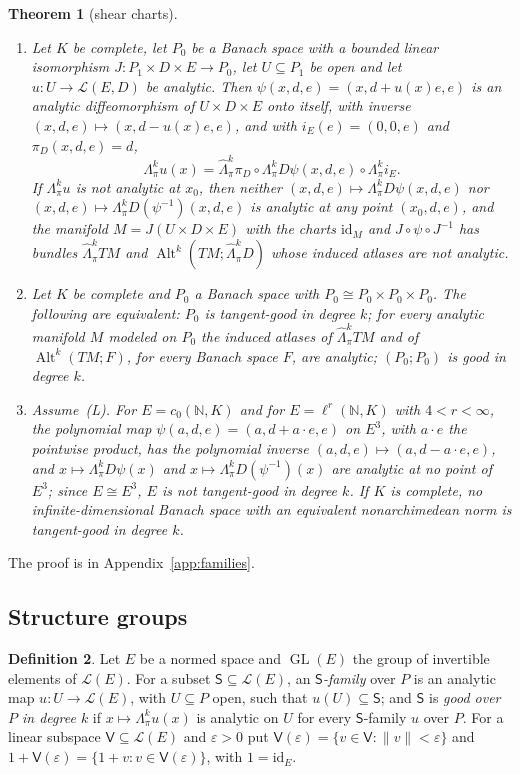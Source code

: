 \documentclass[11pt]{amsart}
\newtheorem{theorem}{Theorem}[section]
\theoremstyle{definition}
\newtheorem{definition}[theorem]{Definition}
\theoremstyle{remark}
\numberwithin{equation}{section}
\newcommand{\N}{\mathbb N}
\newcommand{\cL}{\mathcal L}
\newcommand{\Alt}{\operatorname{Alt}}
\newcommand{\id}{\mathrm{id}}
\newcommand{\norm}[1]{\lVert #1\rVert}
\theoremstyle{plain}
\theoremstyle{definition}
\theoremstyle{plain}
\newcommand{\hLambda}{\widehat\Lambda}
\begin{document}
\begin{theorem}[shear charts]\label{fam2:thm:tangent}
\begin{enumerate}
\item Let $K$ be complete, let $P_0$ be a Banach space with a bounded linear isomorphism $J\colon P_1\times D\times E\to P_0$,
let $U\subseteq P_1$ be open and let $u\colon U\to\cL(E,D)$ be analytic. Then $\psi(x,d,e)=(x,d+u(x)e,e)$ is an analytic
diffeomorphism of $U\times D\times E$ onto itself, with inverse $(x,d,e)\mapsto(x,d-u(x)e,e)$, and with $i_E(e)=(0,0,e)$
and $\pi_D(x,d,e)=d$,
\[
 \Lambda^k_\pi u(x)=\hLambda^k_\pi\pi_D\circ\Lambda^k_\pi D\psi(x,d,e)\circ\Lambda^k_\pi i_E.
\]
If $\Lambda^k_\pi u$ is not analytic at $x_0$, then neither $(x,d,e)\mapsto\Lambda^k_\pi D\psi(x,d,e)$ nor
$(x,d,e)\mapsto\Lambda^k_\pi D(\psi^{-1})(x,d,e)$ is analytic at any point $(x_0,d,e)$, and the manifold
$M=J(U\times D\times E)$ with the charts $\id_M$ and $J\circ\psi\circ J^{-1}$ has bundles $\hLambda^k_\pi TM$ and
$\Alt^k(TM;\hLambda^k_\pi D)$ whose induced atlases are not analytic.
\item Let $K$ be complete and $P_0$ a Banach space with $P_0\cong P_0\times P_0\times P_0$. The following are equivalent:
$P_0$ is tangent-good in degree $k$; for every analytic manifold $M$ modeled on $P_0$ the induced atlases of
$\hLambda^k_\pi TM$ and of $\Alt^k(TM;F)$, for every Banach space $F$, are analytic; $(P_0;P_0)$ is good in degree $k$.
\item Assume~\textup{(L)}. For $E=c_0(\N,K)$ and for $E=\ell^r(\N,K)$ with $4<r<\infty$, the polynomial map
$\psi(a,d,e)=(a,d+a\cdot e,e)$ on $E^3$, with $a\cdot e$ the pointwise product, has the polynomial inverse
$(a,d,e)\mapsto(a,d-a\cdot e,e)$, and $x\mapsto\Lambda^k_\pi D\psi(x)$ and $x\mapsto\Lambda^k_\pi D(\psi^{-1})(x)$ are
analytic at no point of $E^3$; since $E\cong E^3$, $E$ is not tangent-good in degree $k$. If $K$ is complete, no
infinite-dimensional Banach space with an equivalent nonarchimedean norm is tangent-good in degree $k$.
\end{enumerate}
\end{theorem}

The proof is in Appendix~\ref{app:families}.

\subsection{Structure groups}\label{fam2:ssec:groups}

\begin{definition}\label{fam2:def:groups}
Let $E$ be a normed space and $\operatorname{GL}(E)$ the group of invertible elements of $\cL(E)$. For a subset
$\mathsf S\subseteq\cL(E)$, an \emph{$\mathsf S$-family} over $P$ is an analytic map $u\colon U\to\cL(E)$, with $U\subseteq P$
open, such that $u(U)\subseteq\mathsf S$; and $\mathsf S$ is \emph{good over $P$ in degree $k$} if $x\mapsto\Lambda^k_\pi u(x)$
is analytic on $U$ for every $\mathsf S$-family $u$ over $P$. For a linear subspace $\mathsf V\subseteq\cL(E)$ and
$\varepsilon>0$ put $\mathsf V(\varepsilon)=\{v\in\mathsf V:\norm v<\varepsilon\}$ and
$1+\mathsf V(\varepsilon)=\{1+v:v\in\mathsf V(\varepsilon)\}$, with $1=\id_E$.
\end{definition}
\end{document}
